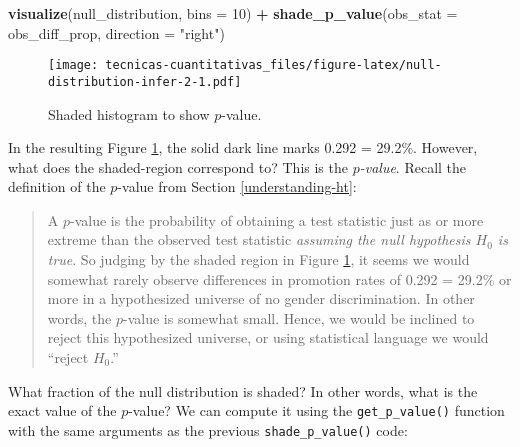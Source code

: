 \documentclass[
]{book}
\newenvironment{Shaded}{\begin{snugshade}}{\end{snugshade}}
\newcommand{\DataTypeTok}[1]{\textcolor[rgb]{0.13,0.29,0.53}{#1}}
\newcommand{\DecValTok}[1]{\textcolor[rgb]{0.00,0.00,0.81}{#1}}
\newcommand{\KeywordTok}[1]{\textcolor[rgb]{0.13,0.29,0.53}{\textbf{#1}}}
\newcommand{\NormalTok}[1]{#1}
\newcommand{\OperatorTok}[1]{\textcolor[rgb]{0.81,0.36,0.00}{\textbf{#1}}}
\newcommand{\StringTok}[1]{\textcolor[rgb]{0.31,0.60,0.02}{#1}}
\begin{document}
\begin{Shaded}
\begin{Highlighting}[]
\KeywordTok{visualize}\NormalTok{(null_distribution, }\DataTypeTok{bins =} \DecValTok{10}\NormalTok{) }\OperatorTok{+}\StringTok{ }
\StringTok{  }\KeywordTok{shade_p_value}\NormalTok{(}\DataTypeTok{obs_stat =}\NormalTok{ obs_diff_prop, }\DataTypeTok{direction =} \StringTok{"right"}\NormalTok{)}
\end{Highlighting}
\end{Shaded}

\begin{figure}
\centering
\texttt{[image: tecnicas-cuantitativas\_files/figure-latex/null-distribution-infer-2-1.pdf]}
\caption{\label{fig:null-distribution-infer-2}Shaded histogram to show \(p\)-value.}
\end{figure}

In the resulting Figure \ref{fig:null-distribution-infer-2}, the solid dark line marks 0.292 = 29.2\%. However, what does the shaded-region correspond to? This is the \emph{\(p\)-value}. Recall the definition of the \(p\)-value from Section \ref{understanding-ht}:

\begin{quote}
A \(p\)-value is the probability of obtaining a test statistic just as or more extreme than the observed test statistic \emph{assuming the null hypothesis \(H_0\) is true}.
So judging by the shaded region in Figure \ref{fig:null-distribution-infer-2}, it seems we would somewhat rarely observe differences in promotion rates of 0.292 = 29.2\% or more in a hypothesized universe of no gender discrimination. In other words, the \(p\)-value is somewhat small. Hence, we would be inclined to reject this hypothesized universe, or using statistical language we would ``reject \(H_0\).''
\end{quote}

What fraction of the null distribution is shaded? In other words, what is the exact value of the \(p\)-value? We can compute it using the \texttt{get\_p\_value()}  function with the same arguments as the previous \texttt{shade\_p\_value()} code:

\begin{Shaded}
\end{Shaded}
\end{document}
